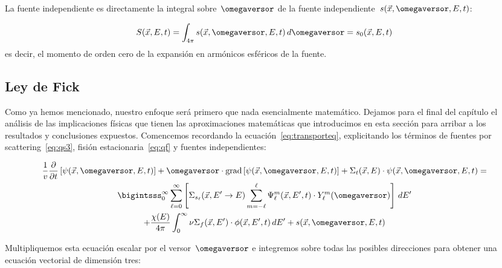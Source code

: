 La fuente independiente es directamente la integral sobre~$\omegaversor$ de la fuente independiente~$s(\vec{x}, \omegaversor, E, t)$:

\begin{equation}\label{eq:S}
 S(\vec{x},E,t) = \int_{4\pi} s(\vec{x}, \omegaversor, E, t) \,  d\omegaversor
  = s_0(\vec{x},E,t)
\end{equation}
%
es decir, el momento de orden cero de la expansión en armónicos esféricos de la fuente.



\subsection{Ley de Fick} %
\label{sec:fick}

{\color{red}\lipsum[1]}

Como ya hemos mencionado, nuestro enfoque será primero que nada esencialmente matemático. Dejamos para el final del capítulo el análisis de las  implicaciones físicas que tienen las aproximaciones matemáticas que introducimos en esta sección para arribar a los resultados y conclusiones expuestos. Comencemos recordando la ecuación~\eqref{eq:transporteq}, explicitando los términos de fuentes por scattering~\eqref{eq:qs3}, fisión estacionaria~\eqref{eq:qf} y fuentes independientes:

\begin{multline}\label{eq:fick1}
 \frac{1}{v} \frac{\partial}{\partial t} \left[ \psi(\vec{x}, \omegaversor, E, t) \right]
 + \omegaversor \cdot \text{grad} \left[ \psi(\vec{x}, \omegaversor, E, t) \right]
 + \Sigma_t(\vec{x}, E) \cdot \psi(\vec{x}, \omegaversor, E, t)
 = \\
\bigintsss_{0}^{\infty} \sum_{\ell=0}^\infty \left[ \Sigma_{s_\ell}(\vec{x}, E^{\prime} \rightarrow E) 
\sum_{m=-\ell}^{\ell} \Psi_\ell^m (\vec{x}, E^{\prime}, t) \cdot Y_\ell^{m}(\omegaversor)  \right] \, dE^{\prime}
\\
+ \frac{\chi(E)}{4\pi} \int_{0}^{\infty} \nu\Sigma_f(\vec{x}, E^\prime) \cdot \phi(\vec{x}, E^\prime, t) \, dE^\prime
+ s(\vec{x}, \omegaversor, E, t)
\end{multline}

Multipliquemos esta ecuación escalar por el versor~$\omegaversor$ e integremos sobre todas las posibles direcciones para obtener una ecuación vectorial de dimensión tres:

